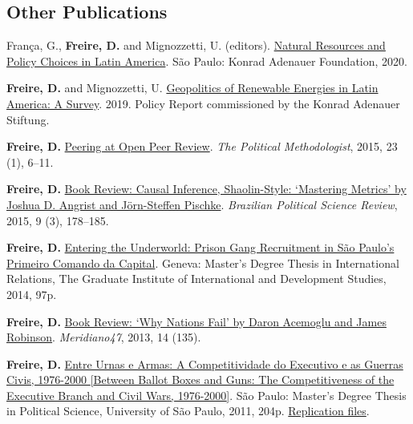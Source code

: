 \documentclass[a4paper]{article}
\renewenvironment{itemize}{
	\begin{list}{}{
			\setlength{\leftmargin}{1.5em}
		}
		}{
	\end{list}
}
\begin{document}
\subsection*{Other Publications}

\begin{itemize}
\item França, G., \textbf{Freire, D.} and Mignozzetti, U. (editors). \href{https://danilofreire.github.io/natural_resources_policy_changes_latam.pdf}{Natural Resources and Policy Choices in Latin America}. São Paulo: Konrad Adenauer Foundation, 2020.
\item \textbf{Freire, D.} and Mignozzetti, U.  \href{https://www.kas.de/documents/273477/273526/Geopolitics+of+Renewable+Energy+in+Latin+America+-+A+Survey.pdf/9fe39ef1-6028-0836-90b0-aada31cb6769?version=1.0&t=1551887777018}{Geopolitics of Renewable Energies in Latin America: A Survey}. 2019. Policy Report commissioned by the Konrad Adenauer Stiftung.
\item \textbf{Freire, D.} \href{https://thepoliticalmethodologist.files.wordpress.com/2016/02/tpm_v23_n1.pdf}{Peering at Open Peer Review}. \textit{The Political Methodologist}, 2015, 23 (1), 6--11.
\item \textbf{Freire, D.} \href{http://www.scielo.br/readcube/epdf.php?doi=10.1590/1981-38212015000300026&pid=S1981-38212015000300178&pdf_path=bpsr/v9n3/1981-3821-bpsr-9-3-0178.pdf&lang=en}{Book Review: Causal Inference, Shaolin-Style: `Mastering Metrics' by Joshua D. Angrist and J\"{o}rn-Steffen Pischke}. \textit{Brazilian Political Science Review}, 2015, 9 (3), 178--185.
\item \textbf{Freire, D.} \href{http://dx.doi.org/10.6084/m9.figshare.1209203}{Entering the Underworld: Prison Gang Recruitment in S\~{a}o Paulo's Primeiro Comando da Capital}. Geneva: Master's Degree Thesis in International Relations, The Graduate Institute of International and Development Studies, 2014, 97p.
\item \textbf{Freire, D.} \href{http://seer.bce.unb.br/index.php/MED/article/view/7505/6497}{Book Review: `Why Nations Fail' by Daron Acemoglu and James Robinson}. \textit{Meridiano47}, 2013, 14 (135).
\item \textbf{Freire, D.} \href{http://dx.doi.org/10.6084/m9.figshare.963082}{Entre Urnas e Armas: A Competitividade do Executivo e as Guerras Civis, 1976-2000 {[}Between Ballot Boxes and Guns: The Competitiveness of the Executive Branch and Civil Wars, 1976-2000{]}}. S\~{a}o Paulo: Master's Degree Thesis in Political Science, University of S\~{a}o Paulo, 2011, 204p. \href{http://dx.doi.org/10.6084/m9.figshare.963183}{Replication files}.
\end{itemize}
\end{document}
